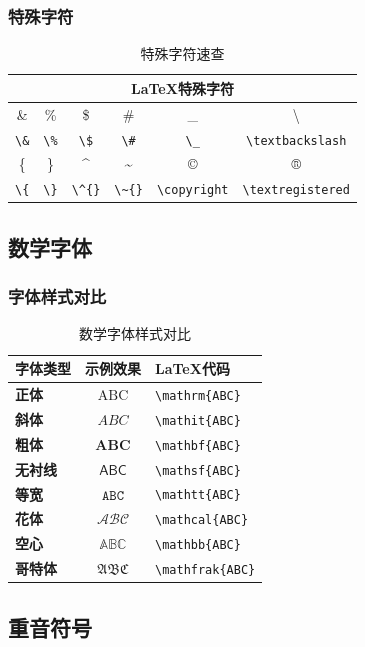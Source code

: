\documentclass{article}
\begin{document}
\subsubsection{特殊字符}
\begin{table}[h]
\small
\centering
\begin{tabular}{*{6}{c}}
\hline
\multicolumn{6}{c}{\textbf{LaTeX特殊字符}} \\
\hline
\& & \% & \$ & \# & \_ & \textbackslash \\
\verb|\&| & \verb|\%| & \verb|\$| & \verb|\#| & \verb|\_| & \verb|\textbackslash| \\
\hline
\{ & \} & \^{} & \~{} & © & ® \\
\verb|\{| & \verb|\}| & \verb|\^{}| & \verb|\~{}| & \verb|\copyright| & \verb|\textregistered| \\
\hline
\end{tabular}
\caption{特殊字符速查}
\end{table}

\subsection{数学字体}

\subsubsection{字体样式对比}
\begin{table}[h]
\centering
\begin{tabular}{>{\bfseries}l|c|>{\ttfamily}l}
\hline
\textbf{字体类型} & \textbf{示例效果} & \textbf{LaTeX代码} \\
\hline
正体 & $\mathrm{ABC}$ & \verb|\mathrm{ABC}| \\
斜体 & $\mathit{ABC}$ & \verb|\mathit{ABC}| \\
粗体 & $\mathbf{ABC}$ & \verb|\mathbf{ABC}| \\
无衬线 & $\mathsf{ABC}$ & \verb|\mathsf{ABC}| \\
等宽 & $\mathtt{ABC}$ & \verb|\mathtt{ABC}| \\
花体 & $\mathcal{ABC}$ & \verb|\mathcal{ABC}| \\
空心 & $\mathbb{ABC}$ & \verb|\mathbb{ABC}| \\
哥特体 & $\mathfrak{ABC}$ & \verb|\mathfrak{ABC}| \\
\hline
\end{tabular}
\caption{数学字体样式对比}
\end{table}

\subsection{重音符号}
\end{document}
